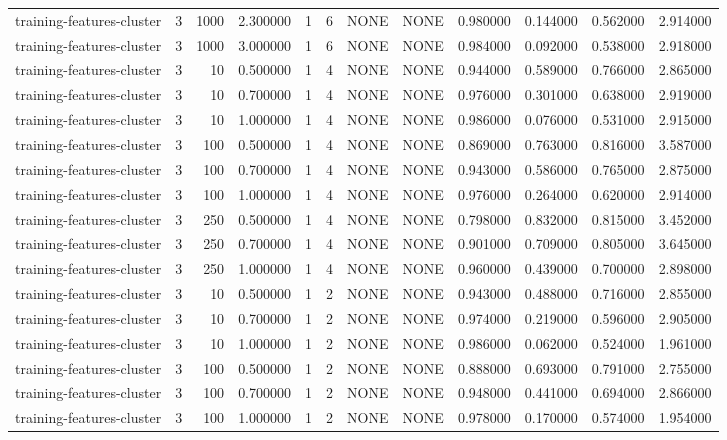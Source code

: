 \begin{tabular}{lrrrllllrrrr}
training-features-cluster & 3 & 1000 & 2.300000 & 1 & 6 & NONE & NONE & 0.980000 & 0.144000 & 0.562000 & 2.914000 \\
training-features-cluster & 3 & 1000 & 3.000000 & 1 & 6 & NONE & NONE & 0.984000 & 0.092000 & 0.538000 & 2.918000 \\
training-features-cluster & 3 & 10 & 0.500000 & 1 & 4 & NONE & NONE & 0.944000 & 0.589000 & 0.766000 & 2.865000 \\
training-features-cluster & 3 & 10 & 0.700000 & 1 & 4 & NONE & NONE & 0.976000 & 0.301000 & 0.638000 & 2.919000 \\
training-features-cluster & 3 & 10 & 1.000000 & 1 & 4 & NONE & NONE & 0.986000 & 0.076000 & 0.531000 & 2.915000 \\
training-features-cluster & 3 & 100 & 0.500000 & 1 & 4 & NONE & NONE & 0.869000 & 0.763000 & 0.816000 & 3.587000 \\
training-features-cluster & 3 & 100 & 0.700000 & 1 & 4 & NONE & NONE & 0.943000 & 0.586000 & 0.765000 & 2.875000 \\
training-features-cluster & 3 & 100 & 1.000000 & 1 & 4 & NONE & NONE & 0.976000 & 0.264000 & 0.620000 & 2.914000 \\
training-features-cluster & 3 & 250 & 0.500000 & 1 & 4 & NONE & NONE & 0.798000 & 0.832000 & 0.815000 & 3.452000 \\
training-features-cluster & 3 & 250 & 0.700000 & 1 & 4 & NONE & NONE & 0.901000 & 0.709000 & 0.805000 & 3.645000 \\
training-features-cluster & 3 & 250 & 1.000000 & 1 & 4 & NONE & NONE & 0.960000 & 0.439000 & 0.700000 & 2.898000 \\
training-features-cluster & 3 & 10 & 0.500000 & 1 & 2 & NONE & NONE & 0.943000 & 0.488000 & 0.716000 & 2.855000 \\
training-features-cluster & 3 & 10 & 0.700000 & 1 & 2 & NONE & NONE & 0.974000 & 0.219000 & 0.596000 & 2.905000 \\
training-features-cluster & 3 & 10 & 1.000000 & 1 & 2 & NONE & NONE & 0.986000 & 0.062000 & 0.524000 & 1.961000 \\
training-features-cluster & 3 & 100 & 0.500000 & 1 & 2 & NONE & NONE & 0.888000 & 0.693000 & 0.791000 & 2.755000 \\
training-features-cluster & 3 & 100 & 0.700000 & 1 & 2 & NONE & NONE & 0.948000 & 0.441000 & 0.694000 & 2.866000 \\
training-features-cluster & 3 & 100 & 1.000000 & 1 & 2 & NONE & NONE & 0.978000 & 0.170000 & 0.574000 & 1.954000 \\

\end{tabular}
